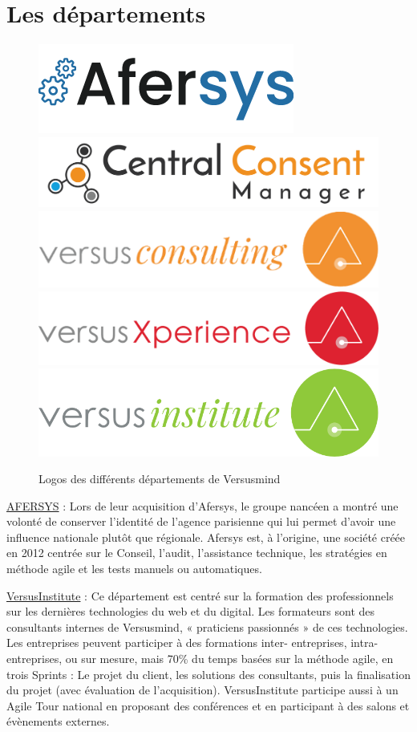 \documentclass[12pt, a4paper]{report}
\begin{document}
\section{Les départements}
\begin{figure}[H]
    \centering
    \includegraphics[width=.35\textwidth]{afersys.png}
    \includegraphics[width=.5\textwidth]{ccm_.png}
    \includegraphics[width=.45\textwidth]{versusconsulting.png}
    \includegraphics[width=.5\textwidth]{versusxperience.png}
    \includegraphics[width=.45\textwidth]{versusinstitute.png}
    \caption{Logos des différents départements de Versusmind}
\end{figure}
\underline{AFERSYS} : Lors de leur acquisition d’Afersys, le groupe nancéen a montré une volonté de conserver
l’identité de l’agence parisienne qui lui permet d’avoir une influence nationale plutôt que régionale.
Afersys est, à l’origine, une société créée en 2012 centrée sur le Conseil, l’audit, l’assistance technique,
les stratégies en méthode agile et les tests manuels ou automatiques.\newline

\underline{VersusInstitute} : Ce département est centré sur la formation des professionnels sur les dernières
technologies du web et du digital. Les formateurs sont des consultants internes de Versusmind,
« praticiens passionnés » de ces technologies. Les entreprises peuvent participer à des formations inter-
entreprises, intra-entreprises, ou sur mesure, mais 70\% du temps basées sur la méthode agile, en trois
Sprints : Le projet du client, les solutions des consultants, puis la finalisation du projet (avec évaluation
de l’acquisition). VersusInstitute participe aussi à un Agile Tour national en proposant des conférences
et en participant à des salons et évènements externes.\newline
\end{document}
